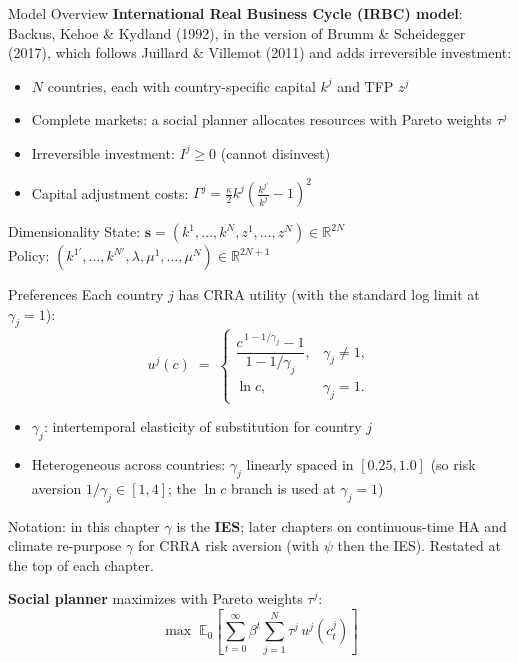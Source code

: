 \documentclass[aspectratio=169,11pt]{beamer}
\newcommand{\emphc}[1]{\textcolor{harvardcrimson}{#1}}
\newcommand{\R}{\mathbb{R}}
\begin{document}
\begin{frame}{Model Overview}
\textbf{International Real Business Cycle (IRBC) model}: Backus, Kehoe \& Kydland (1992), in the version of Brumm \& Scheidegger (2017), which follows Juillard \& Villemot (2011) and adds irreversible investment:

\vspace{0.5em}
\begin{itemize}
    \item $N$ countries, each with \emphc{country-specific capital} $k^j$ and \emphc{TFP} $z^j$
    \item \emphc{Complete markets}: a social planner allocates resources with Pareto weights $\tau^j$
    \item \emphc{Irreversible investment}: $I^j \geq 0$ (cannot disinvest)
    \item \emphc{Capital adjustment costs}: $\Gamma^j = \frac{\kappa}{2} k^j \!\left(\frac{k^{j\prime}}{k^j} - 1\right)^{\!2}$
\end{itemize}

\vspace{0.5em}
\begin{block}{Dimensionality}
State: $\bm{s} = (k^1, \ldots, k^N, z^1, \ldots, z^N) \in \R^{2N}$\\
Policy: $(k^{1\prime}, \ldots, k^{N\prime}, \lambda, \mu^1, \ldots, \mu^N) \in \R^{2N+1}$
\end{block}
\end{frame}

\begin{frame}{Preferences}
\small
Each country $j$ has \emphc{CRRA utility} (with the standard log limit at $\gamma_j = 1$):
\[
u^j(c) \;=\; \begin{cases} \dfrac{c^{\,1 - 1/\gamma_j} - 1}{1 - 1/\gamma_j}, & \gamma_j \neq 1, \\[4pt] \ln c, & \gamma_j = 1. \end{cases}
\]

\vspace{0.2em}
\begin{itemize}\itemsep2pt
    \item $\gamma_j$: intertemporal elasticity of substitution for country $j$
    \item \emphc{Heterogeneous} across countries: $\gamma_j$ linearly spaced in $[0.25, 1.0]$ (so risk aversion $1/\gamma_j \in [1, 4]$; the $\ln c$ branch is used at $\gamma_j = 1$)
\end{itemize}

\vspace{0.2em}
{\scriptsize \emphc{Notation:} in this chapter $\gamma$ is the \textbf{IES}; later chapters on continuous-time HA and climate re-purpose $\gamma$ for CRRA risk aversion (with $\psi$ then the IES). Restated at the top of each chapter.}

\vspace{0.3em}
\textbf{Social planner} maximizes with Pareto weights $\tau^j$:
\[
\max \; \mathbb{E}_0\!\left[\sum_{t=0}^{\infty} \beta^t \sum_{j=1}^{N} \tau^j \, u^j(c_t^j)\right]
\]
\end{frame}
\end{document}
